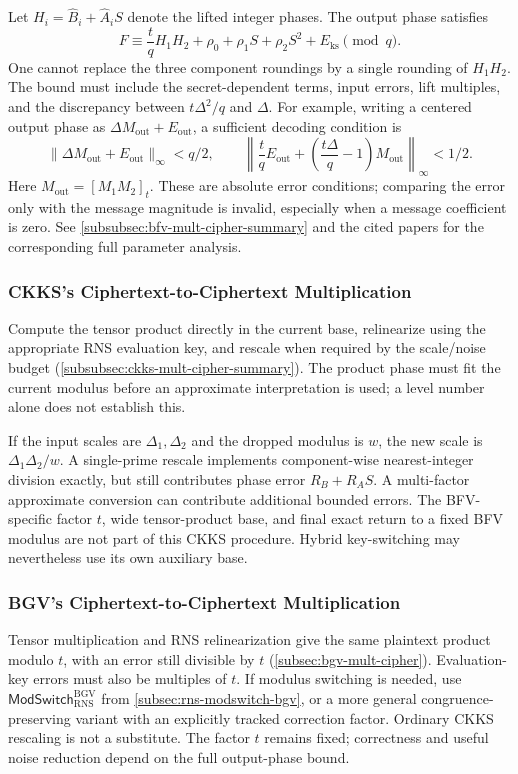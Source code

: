 Let $H_i=\widehat B_i+\widehat A_iS$ denote the lifted integer phases. The output phase satisfies
\[
F\equiv\frac tqH_1H_2+\rho_0+\rho_1S+\rho_2S^2+E_{\mathrm{ks}}\pmod q.
\]
One cannot replace the three component roundings by a single rounding of $H_1H_2$. The bound must include the secret-dependent terms, input errors, lift multiples, and the discrepancy between $t\Delta^2/q$ and $\Delta$. For example, writing a centered output phase as $\Delta M_{\mathrm{out}}+E_{\mathrm{out}}$, a sufficient decoding condition is
\[
\|\Delta M_{\mathrm{out}}+E_{\mathrm{out}}\|_\infty<q/2,\qquad
\left\|\frac tqE_{\mathrm{out}}+\left(\frac{t\Delta}{q}-1\right)M_{\mathrm{out}}\right\|_\infty<1/2.
\]
Here $M_{\mathrm{out}}=[M_1M_2]_t$. These are absolute error conditions; comparing the error only with the message magnitude is invalid, especially when a message coefficient is zero. See \autoref{subsubsec:bfv-mult-cipher-summary} and the cited papers for the corresponding full parameter analysis.


\subsubsection{CKKS's Ciphertext-to-Ciphertext Multiplication}
\label{subsubsec:rns-cipher-mult-ckks}

Compute the tensor product directly in the current base, relinearize using the appropriate RNS evaluation key, and rescale when required by the scale/noise budget (\autoref{subsubsec:ckks-mult-cipher-summary}). The product phase must fit the current modulus before an approximate interpretation is used; a level number alone does not establish this.

If the input scales are $\Delta_1,\Delta_2$ and the dropped modulus is $w$, the new scale is $\Delta_1\Delta_2/w$. A single-prime rescale implements component-wise nearest-integer division exactly, but still contributes phase error $R_B+R_AS$. A multi-factor approximate conversion can contribute additional bounded errors. The BFV-specific factor $t$, wide tensor-product base, and final exact return to a fixed BFV modulus are not part of this CKKS procedure. Hybrid key-switching may nevertheless use its own auxiliary base.


\subsubsection{BGV's Ciphertext-to-Ciphertext Multiplication}
\label{subsubsec:rns-cipher-mult-bgv}

Tensor multiplication and RNS relinearization give the same plaintext product modulo $t$, with an error still divisible by $t$ (\autoref{subsec:bgv-mult-cipher}). Evaluation-key errors must also be multiples of $t$. If modulus switching is needed, use $\textsf{ModSwitch}_{\mathrm{RNS}}^{\mathrm{BGV}}$ from \autoref{subsec:rns-modswitch-bgv}, or a more general congruence-preserving variant with an explicitly tracked correction factor. Ordinary CKKS rescaling is not a substitute. The factor $t$ remains fixed; correctness and useful noise reduction depend on the full output-phase bound.


